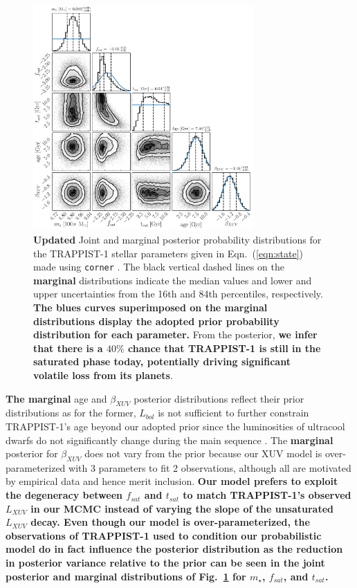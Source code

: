 \documentclass[twocolumn]{aastex62}
\newcommand{\xxx}[1]{{\textbf{#1}}}
\begin{document}
\begin{figure}[t]
\centering
	\includegraphics[width=0.75\textwidth]{../Analysis/Corner/trappist1Corner.pdf}
   \caption{\xxx{Updated} Joint and marginal posterior probability distributions for the TRAPPIST-1 stellar parameters given in Eqn.~(\ref{eqn:state}) made using \texttt{corner} \citep{ForemanMackey2016}. The black vertical dashed lines on the \xxx{marginal} distributions indicate the median values and lower and upper uncertainties from the 16th and 84th percentiles, respectively. \xxx{The blues curves superimposed on the marginal distributions display the adopted prior probability distribution for each parameter.} From the posterior, \xxx{we infer that there is a $40\%$ chance that TRAPPIST-1 is still in the saturated phase today, potentially driving significant volatile loss from its planets}.}%
    \label{fig:corner}%
\end{figure}

\xxx{The marginal} age and $\beta_{XUV}$ posterior distributions reflect their prior distributions as for the former, $L_{bol}$ is not sufficient to further constrain TRAPPIST-1's age beyond our adopted prior since the luminosities of ultracool dwarfs do not significantly change during the main sequence \citep{Baraffe2015}. The \xxx{marginal} posterior for $\beta_{XUV}$ does not vary from the prior because our XUV model is over-parameterized with 3 parameters to fit 2 observations, although all are motivated by empirical data and hence merit inclusion. \xxx{Our model prefers to exploit the degeneracy between $f_{sat}$ and $t_{sat}$ to match TRAPPIST-1's observed $L_{XUV}$ in our MCMC instead of varying the slope of the unsaturated $L_{XUV}$ decay. Even though our model is over-parameterized, the observations of TRAPPIST-1 used to condition our probabilistic model do in fact influence the posterior distribution as the reduction in posterior variance relative to the prior can be seen in the joint posterior and marginal distributions of Fig.~\ref{fig:corner} for $m_{\star}$, $f_{sat}$, and $t_{sat}$.}
\end{document}
